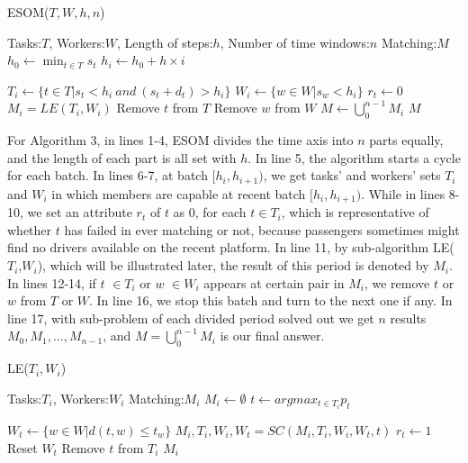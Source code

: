\documentclass[color,twoside,amssymb,twocolumn]{article}
\begin{document}
\begin{algorithm}[h]
	\caption{ESOM($T,W,h,n$)}
	\label{alg3}
	\begin{algorithmic}[1]
		\REQUIRE Tasks:$T$, Workers:$W$, Length of steps:$h$, Number of time windows:$n$
		\ENSURE Matching:$M$
		\STATE $h_0 \leftarrow \min_{t \in T}s_t$
		\STATE $h_i \leftarrow h_0 + h \times i$
		\ENDFOR
		
		\STATE $T_i \leftarrow \{t\in T|s_t < h_i\ and\ (s_t+d_t) > h_i\}$ 
		\STATE $W_i \leftarrow \{w\in W|s_w < h_i\}$
		\STATE $r_t \leftarrow 0$
		\ENDFOR
		\STATE $M_i = LE(T_i,W_i)$
		\STATE Remove $t$ from $T$
		\STATE Remove $w$ from $W$
		\ENDFOR
		\ENDFOR
		\STATE $M \leftarrow \bigcup_{0}^{n-1} M_i$
		\RETURN $M$	
	\end{algorithmic} 
\end{algorithm}

For Algorithm 3, in lines 1-4, ESOM divides the time axis into $n$ parts equally, and the length of each part is all set with $h$. In line 5, the algorithm starts a cycle for each batch. In lines 6-7, at batch $[h_i,h_{i+1})$, we get tasks' and workers' sets  $T_i$ and $W_i$ in which members are capable at recent batch $[h_i,h_{i+1})$. While in lines 8-10, we set an attribute $r_t$ of $t$ as 0, for each $t \in T_i$, which is representative of whether $t$ has failed in ever matching or not, because passengers sometimes might find no drivers available on the recent platform. In line 11, by sub-algorithm LE($T_i$,$W_i$), which will be illustrated later, the result of this period is denoted by $M_i$. In lines 12-14, if $t$ $\in T_i$ or $w$ $\in W_i$ appears at certain pair in $M_i$, we remove $t$ or $w$ from $T$ or $W$. In line 16, we stop this batch and turn to the next one if any. In line 17, with sub-problem of each divided period solved out we get $n$ results $M_0,M_1,...,M_{n-1}$, and $M = \bigcup^{n-1}_{0}M_i$ is our final answer.

\begin{algorithm}[h]
	\caption{LE($T_i,W_i$)}
	\label{alg4}
	\begin{algorithmic}[1]
		\REQUIRE Tasks:$T_i$, Workers:$W_i$
		\ENSURE Matching:$M_i$
		\STATE $M_i \leftarrow \emptyset$
		\STATE $t \leftarrow argmax_{t\in T_i}p_t$
		
		\STATE $W_t \leftarrow \{w\in W|d(t,w)\leq t_w\}$		
		\STATE $M_i,T_i,W_i,W_t = SC(M_i,T_i,W_i,W_t,t)$
		\STATE $r_t \leftarrow 1$
		\STATE Reset $W_t$
		\ENDIF
		\ELSE
		\STATE Remove $t$ from $T_i$
		\ENDIF
		\ENDWHILE	
		\RETURN $M_i$
	\end{algorithmic} 
\end{algorithm}
\end{document}
